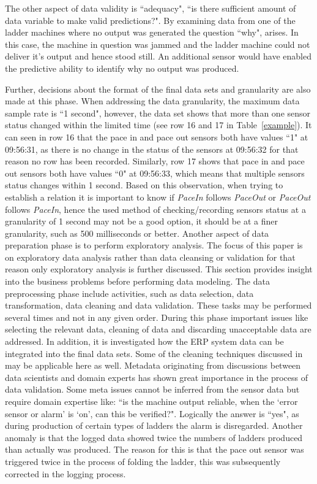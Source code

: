 \documentclass[runningheads]{llncs}
\begin{document}
The other aspect of data validity is ``adequacy", ``is there sufficient amount of data variable to make valid predictions?". By examining data from one of the ladder machines where no output was generated the question ``why", arises. In this case, the  machine in question was jammed and the ladder machine could not deliver it’s output and hence stood still. An additional sensor would have enabled the predictive ability to identify why no output was produced. 

Further, decisions about the format of the final data sets and granularity are also made at this phase. When addressing the data granularity, the maximum data sample rate is ``1 second", however, the data set shows that more than one sensor status changed within the limited time (see row 16 and 17 in Table~\ref{example}). It can seen in row 16 that the pace in and pace out sensors both have values ``1" at 09:56:31, as there is no change in the status of the sensors at 09:56:32 for that reason no row has been recorded. Similarly, row 17 shows that pace in and pace out sensors both have values ``0" at 09:56:33, which means that multiple sensors status changes within 1 second. Based on this observation, when trying to establish a relation it is important to know if \emph{PaceIn} follows \emph{PaceOut} or \emph{PaceOut} follows \emph{PaceIn}, hence the used method of checking/recording sensors status at a granularity of 1 second may not be a good option, it should be at a finer granularity, such as 500 milliseconds or better.
Another aspect of data preparation phase is to perform exploratory analysis. The focus of this paper is on exploratory data analysis rather than data cleansing or validation for that reason only exploratory analysis is further discussed.
\fi
This section provides insight into the business problems before performing data modeling. The data preprocessing phase include activities, such as data selection, data transformation, data cleaning and data validation. These tasks may be performed several times and not in any given order. During this phase important issues like selecting the relevant data, cleaning of data and discarding unacceptable data are addressed. In addition, it is investigated how the ERP system data can be integrated into the final data sets. Some of the cleaning techniques discussed in \cite{iftikhar} may be applicable here as well. Metadata originating from discussions between data scientists and domain experts has shown great importance in the process of data validation. Some meta issues cannot be inferred from the sensor data but require domain expertise like: ``is the machine output reliable, when the `error sensor or alarm' is `on', can this be verified?". Logically the answer is ``yes", as during production of certain types of ladders the alarm is disregarded. Another anomaly is that the logged data showed twice the numbers of ladders produced than actually was produced. The reason for this is that the pace out sensor was triggered twice in the process of folding the ladder, this was subsequently corrected in the logging process. 
\end{document}
